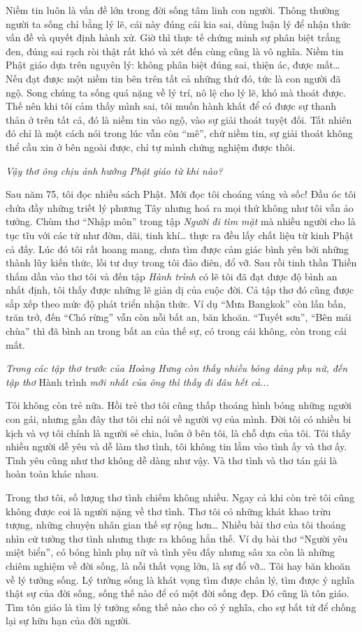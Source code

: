 \documentclass[../main.tex]{subfiles}
\begin{document}
\begin{multicols}{2}
Niềm tin luôn là vấn đề lớn trong đời sống tâm linh con người. Thông thường người ta sống chỉ bằng lý lẽ, cái này đúng cái kia sai, dùng luận lý để nhận thức vấn đề và quyết định hành xử. Giờ thì thực tế chứng minh sự phân biệt trắng đen, đúng sai rạch ròi thật rất khó và xét đến cùng cũng là vô nghĩa. Niềm tin Phật giáo dựa trên nguyên lý: không phân biệt đúng sai, thiện ác, được mất… Nếu đạt được một niềm tin bên trên tất cả những thứ đó, tức là con người đã ngộ. Song chúng ta sống quá nặng về lý trí, nô lệ cho lý lẽ, khó mà thoát được. Thế nên khi tôi cảm thấy mình sai, tôi muốn hành khất để có được sự thanh thản ở trên tất cả, đó là niềm tin vào ngộ, vào sự giải thoát tuyệt đối. Tất nhiên đó chỉ là một cách nói trong lúc vẫn còn “mê”, chứ niềm tin, sự giải thoát không thể cầu xin ở bên ngoài được, chỉ tự mình chứng nghiệm được thôi. 
 
\textit{Vậy thơ ông chịu ảnh hưởng Phật giáo từ khi nào?} 
 
Sau năm 75, tôi đọc nhiều sách Phật. Mới đọc tôi choáng váng và sốc! Đầu óc tôi chứa đầy những triết lý phương Tây nhưng hoá ra mọi thứ không như tôi vẫn ảo tưởng. Chùm thơ “Nhập môn” trong tập \textit{Người đi tìm mặt} mà nhiều người cho là tục tĩu với các từ như đờm, dãi, tinh khí… thực ra đều lấy chất liệu từ kinh Phật cả đấy. Lúc đó tôi rất hoang mang, chưa tìm được cảm giác bình yên bởi những thành lũy kiến thức, lối tư duy trong tôi đảo điên, đổ vỡ. Sau rồi tinh thần Thiền thấm dần vào thơ tôi và đến tập \textit{Hành trình} có lẽ tôi đã đạt được độ bình an nhất định, tôi thấy được những lẽ giản dị của cuộc đời. Cả tập thơ đó cũng được sắp xếp theo mức độ phát triển nhận thức. Ví dụ “Mưa Bangkok” còn lấn bấn, trăn trở, đến “Chó rừng” vẫn còn nỗi bất an, băn khoăn. “Tuyết sơn”, “Bên mái chùa” thì đã bình an trong bất an của thế sự, có trong cái không, còn trong cái mất.  
 
\textit{Trong các tập thơ trước của Hoàng Hưng còn thấy nhiều bóng dáng phụ nữ, đến tập thơ }Hành trình\textit{ mới nhất của ông thì thấy đi đâu hết cả...} 
 
Tôi không còn trẻ nữa. Hồi trẻ thơ tôi cũng thấp thoáng hình bóng những người con gái, nhưng gần đây thơ tôi chỉ nói về người vợ của mình. Đời tôi có nhiều bi kịch và vợ tôi chính là người sẻ chia, luôn ở bên tôi, là chỗ dựa của tôi. Tôi thấy nhiều người dễ yêu và dễ làm thơ tình, tôi không tin lắm vào tình ấy và thơ ấy. Tình yêu cũng như thơ không dễ dàng như vậy. Và thơ tình và thơ tán gái là hoàn toàn khác nhau.  
 
Trong thơ tôi, số lượng thơ tình chiếm không nhiều. Ngay cả khi còn trẻ tôi cũng không được coi là người nặng về thơ tình. Thơ tôi có những khát khao trừu tượng, những chuyện nhân gian thế sự rộng hơn… Nhiều bài thơ của tôi thoáng nhìn cứ tưởng thơ tình nhưng thực ra không hẳn thế. Ví dụ bài thơ “Người yêu miệt biển”, có bóng hình phụ nữ và tình yêu đấy nhưng sâu xa còn là những chiêm nghiệm về đời sống, là nỗi thất vọng lớn, là sự đổ vỡ… Tôi hay băn khoăn về lý tưởng sống. Lý tưởng sống là khát vọng tìm được chân lý, tìm được ý nghĩa thật sự của đời sống, sống thế nào để có một đời sống đẹp. Đó cũng là tôn giáo. Tìm tôn giáo là tìm lý tưởng sống thế nào cho có ý nghĩa, cho sự bất tử để chống lại sự hữu hạn của đời người.  
 

\end{multicols}
\end{document}
